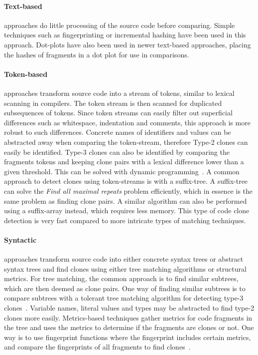 \paragraph{Text-based} approaches do little processing of the source code before
comparing. Simple techniques such as fingerprinting or incremental hashing have been used
in this approach. Dot-plots have also been used in newer text-based approaches, placing
the hashes of fragments in a dot plot for use in comparisons.

\paragraph{Token-based} approaches transform source code into a stream of tokens, similar
to lexical scanning in compilers. The token stream is then scanned for duplicated
subsequences of tokens. Since token streams can easily filter out superficial differences
such as whitespace, indentation and comments, this approach is more robust to such
differences. Concrete names of identifiers and values can be abstracted away when
comparing the token-stream, therefore Type-2 clones can easily be identified. Type-3
clones can also be identified by comparing the fragments tokens and keeping clone pairs
with a lexical difference lower than a given threshold. This can be solved with dynamic
programming~\cite{BakerSparseDynamicProgramming}. A common approach to detect clones using
token-streams is with a suffix-tree\cite{Zibran_real_time_search}. A suffix-tree can solve
the \textit{Find all maximal repeats} problem efficiently, which in essence is the same
problem as finding clone pairs. A similar algorithm can also be performed using a suffix-array
instead, which requires less memory. This type of code clone detection is very fast
compared to more intricate types of matching techniques.

\paragraph{Syntactic} approaches transform source code into either concrete syntax trees
or abstract syntax trees and find clones using either tree matching algorithms or
structural metrics. For tree matching, the common approach is to find similar subtrees,
which are then deemed as clone pairs. One way of finding similar subtrees is to compare
subtrees with a tolerant tree matching algorithm for detecting type-3
clones~\cite{ASTCloneDetection}. Variable names, literal values and types may be
abstracted to find type-2 clones more easily. Metrics-based techniques gather metrics for
code fragments in the tree and uses the metrics to determine if the fragments are clones
or not. One way is to use fingerprint functions where the fingerprint includes certain
metrics, and compare the fingerprints of all fragments to find clones~\cite{Deckard}.

